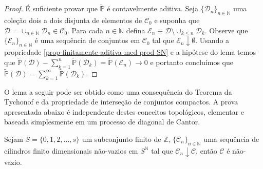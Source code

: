 \begin{proof}
É suficiente provar que 
$\widetilde{\mathbb{P}}$ é contavelmente aditiva.
Seja $\{\mathcal{D}_n\}_{n\in\mathbb{N}}$
uma coleção dois a dois disjunta de elementos 
de $\mathscr{C}_0$ 
e suponha que 
$\mathcal{D}=\cup_{n\in\mathbb{N}}\mathcal{D}_n\in\mathscr{C}_0$.
Para cada $n\in\mathbb{N}$ defina  
$\mathcal{E}_n\equiv \mathcal{D}\setminus \cup_{k\leq n}\mathcal{D}_k$.
Observe que $\{\mathcal{E}_n\}_{n\in\mathbb{N}}$ é uma sequência de 
conjuntos em $\mathscr{C}_0$ tal que $\mathcal{E}_n\downarrow \emptyset$.
Usando a propriedade \eqref{prop-finitamente-aditiva-med-prod-SN}
e a hipótese do lema temos que 
$
\widetilde{\mathbb{P}}(\mathcal{D})
- 
\sum_{k=1}^n\widetilde{\mathbb{P}}(\mathcal{D}_k)
=
\widetilde{\mathbb{P}}(\mathcal{E}_n)
\to 0
$ 
e portanto concluímos que 
$
\widetilde{\mathbb{P}}(\mathcal{D})
=
\sum_{k=1}^{\infty}\widetilde{\mathbb{P}}(\mathcal{D}_k).
$
\end{proof}




O lema a seguir pode ser obtido como uma consequência 
do Teorema da Tychonof e da propriedade de interseção 
de conjuntos compactos. A prova apresentada abaixo é 
independente destes conceitos topológicos, elementar 
e baseada simplesmente em um processo 
de diagonal de Cantor.

\begin{lema}
Sejam $S=\{0,1,2,\ldots,s\}$ um subconjunto finito de $\mathbb{Z}$,  
$\{\mathcal{C}_n\}_{n\in\mathbb{N}}$ uma sequência 
de cilindros finito dimensionais não-vazios em $S^{\mathbb{N}}$
tal que $\mathcal{C}_n\downarrow \mathcal{C}$, então 
$\mathcal{C}$ é não-vazio.
\end{lema}
